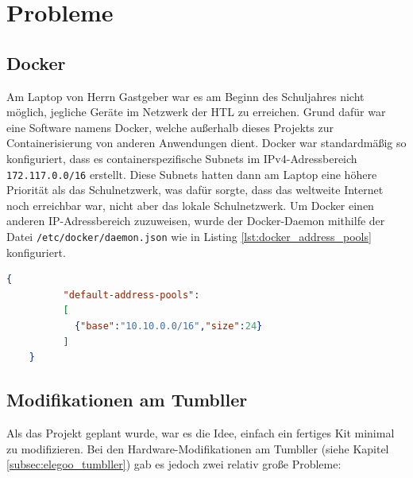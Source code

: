 
\chapter{Probleme}
\label{sec:probleme}
\section{Docker}
\label{subsec:probleme_docker}
Am Laptop von Herrn Gastgeber war es am Beginn des Schuljahres nicht möglich,
jegliche Geräte im Netzwerk der HTL zu erreichen.
%
Grund dafür war eine Software namens Docker,
welche außerhalb dieses Projekts zur Containerisierung von anderen Anwendungen dient.
%
Docker war standardmäßig so konfiguriert,
dass es containerspezifische Subnets im IPv4-Adressbereich \allowbreak\texttt{172.117.0.0/16} erstellt.
%
Diese Subnets hatten dann am Laptop eine höhere Priorität als das Schulnetzwerk,
was dafür sorgte,
dass das weltweite Internet noch erreichbar war, 
nicht aber das lokale Schulnetzwerk.
%
Um Docker einen anderen IP-Adressbereich zuzuweisen,
wurde der Docker-Daemon mithilfe der Datei \texttt{/etc/docker/daemon.json}
wie in Listing \ref{lst:docker_address_pools} konfiguriert.
\begin{lstlisting}[language=json,gobble=4,
    label=lst:docker_address_pools,caption=Konfiguration für den Docker-Daemon]
    {
          "default-address-pools":
          [
            {"base":"10.10.0.0/16","size":24}
          ]
    }
\end{lstlisting}

\section{Modifikationen am Tumbller}
\label{subsec:problem_tumbbler_mods}
Als das Projekt geplant wurde,
war es die Idee,
einfach ein fertiges Kit minimal zu modifizieren.
%
Bei den Hardware-Modifikationen am Tumbller (siehe Kapitel \ref{subsec:elegoo_tumbller}) gab es jedoch zwei relativ große Probleme:

